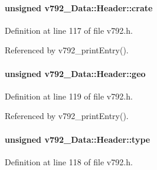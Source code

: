 \paragraph[{crate}]{\setlength{\rightskip}{0pt plus 5cm}unsigned {\bf v792\_\-Data::Header::crate}}\hfill\label{structv792__Data_1_1Header_a9deb16cad3472831a82e8771da14e9f4}


Definition at line 117 of file v792.h.

Referenced by v792\_\-printEntry().
\paragraph[{geo}]{\setlength{\rightskip}{0pt plus 5cm}unsigned {\bf v792\_\-Data::Header::geo}}\hfill\label{structv792__Data_1_1Header_a74618002649af2b85abc3740d46a7125}


Definition at line 119 of file v792.h.

Referenced by v792\_\-printEntry().
\paragraph[{type}]{\setlength{\rightskip}{0pt plus 5cm}unsigned {\bf v792\_\-Data::Header::type}}\hfill\label{structv792__Data_1_1Header_a9d7cc598922939fdc4608d9d7ccef54b}


Definition at line 118 of file v792.h.